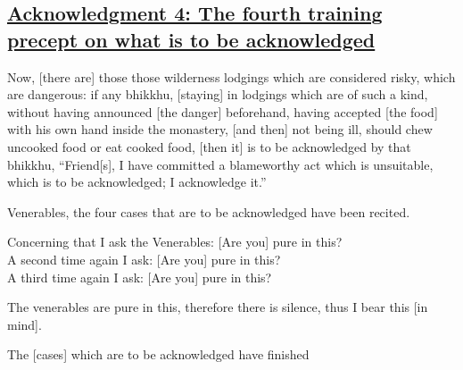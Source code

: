 \subsection*{\hyperref[pd4]{Acknowledgment 4: The fourth training precept on what is to be acknowledged}}
\label{ack4}
Now, [there are] those those wilderness lodgings which are considered risky, which are dangerous: if any bhikkhu, [staying] in lodgings which are of such a kind, without having announced [the danger] beforehand, having accepted [the food] with his own hand inside the monastery, [and then] not being ill, should chew uncooked food or eat cooked food, [then it] is to be acknowledged by that bhikkhu, ``Friend[s], I have committed a blameworthy act which is unsuitable, which is to be acknowledged; I acknowledge it.''

\medskip

\begin{center}
Venerables, the four cases that are to be acknowledged have been recited.

\smallskip

Concerning that I ask the Venerables: [Are you] pure in this?\\
A second time again I ask: [Are you] pure in this?\\
A third time again I ask: [Are you] pure in this?

\smallskip

The venerables are pure in this, therefore there is silence, thus I bear this [in mind].
\end{center}

\begin{outro}
  The [cases] which are to be acknowledged have finished
\end{outro}

\clearpage
